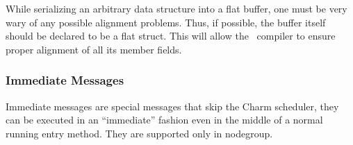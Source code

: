 While serializing an arbitrary data structure into a flat buffer, one must be
very wary of any possible alignment problems.  Thus, if possible, the buffer
itself should be declared to be a flat struct.  This will allow the \CC\
compiler to ensure proper alignment of all its member fields.



\subsubsection{Immediate Messages}

Immediate messages are special messages that skip the Charm scheduler, they
can be executed in an ``immediate'' fashion even in the middle of 
a normal running entry method. 
They are supported only in nodegroup.



